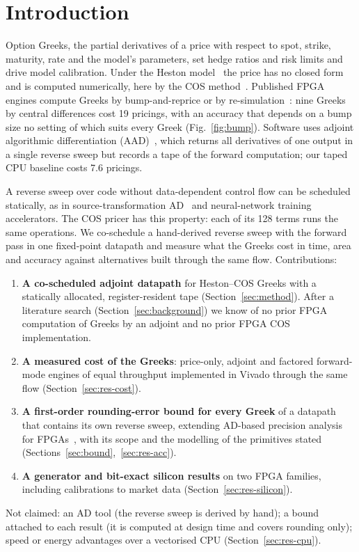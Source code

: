 \documentclass[conference]{IEEEtran}
\begin{document}
\section{Introduction}
Option Greeks, the partial derivatives of a price with respect to spot, strike, maturity, rate
and the model's parameters, set hedge ratios and risk limits and drive model calibration. Under
the Heston model~\cite{heston} the price has no closed form and is computed numerically, here by
the COS method~\cite{fang}. Published FPGA engines compute Greeks by bump-and-reprice or by
re-simulation~\cite{klai,klaih2rc,vitisquant}: nine Greeks by central differences cost 19
pricings, with an accuracy that depends on a bump size no setting of which suits every Greek
(Fig.~\ref{fig:bump}). Software uses adjoint algorithmic differentiation (AAD)~\cite{giles,capriotti,capgiles24},
which returns all derivatives of one output in a single reverse sweep but records a tape of the
forward computation; our taped CPU baseline costs 7.6 pricings.

A reverse sweep over code without data-dependent control flow can be scheduled statically, as in
source-transformation AD~\cite{tapenade} and neural-network training accelerators. The COS pricer
has this property: each of its 128 terms runs the same operations. We co-schedule a hand-derived
reverse sweep with the forward pass in one fixed-point datapath and measure what the Greeks cost
in time, area and accuracy against alternatives built through the same flow. Contributions:
\begin{enumerate}
\item \textbf{A co-scheduled adjoint datapath} for Heston--COS Greeks with a statically allocated,
register-resident tape (Section~\ref{sec:method}). After a literature search
(Section~\ref{sec:background}) we know of no prior FPGA computation of Greeks by an adjoint and no
prior FPGA COS implementation.
\item \textbf{A measured cost of the Greeks}: price-only, adjoint and factored forward-mode engines
of equal throughput implemented in Vivado through the same flow (Section~\ref{sec:res-cost}).
\item \textbf{A first-order rounding-error bound for every Greek} of a datapath that contains its own
reverse sweep, extending AD-based precision analysis for FPGAs~\cite{gaffar,lee06}, with its scope
and the modelling of the primitives stated (Sections~\ref{sec:bound},~\ref{sec:res-acc}).
\item \textbf{A generator and bit-exact silicon results} on two FPGA families, including
calibrations to market data (Section~\ref{sec:res-silicon}).
\end{enumerate}
Not claimed: an AD tool (the reverse sweep is derived by hand); a bound attached to each result
(it is computed at design time and covers rounding only); speed or energy advantages over a
vectorised CPU (Section~\ref{sec:res-cpu}).
\end{document}
